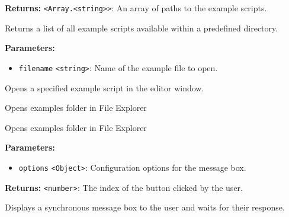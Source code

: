 \documentclass[12pt,a4paper]{article}
\begin{document}
\noindent \textbf{Returns:} \texttt{<Array.<string>>}: An array of paths to the example scripts.

\noindent Returns a list of all example scripts available within a predefined directory.

\vspace{5mm}
\noindent {}


\noindent \textbf{Parameters:}
\begin{itemize}
  \item \texttt{filename} \texttt{<string>}: Name of the example file to open.
\end{itemize}

\noindent Opens a specified example script in the editor window.

\vspace{5mm}
\noindent {}


\noindent Opens examples folder in File Explorer

\vspace{5mm}
\noindent {}


\noindent Opens examples folder in File Explorer

\vspace{5mm}
\noindent {}


\noindent \textbf{Parameters:}
\begin{itemize}
  \item \texttt{options} \texttt{<Object>}: Configuration options for the message box.
\end{itemize}

\noindent \textbf{Returns:} \texttt{<number>}: The index of the button clicked by the user.

\noindent Displays a synchronous message box to the user and waits for their response.

\vspace{5mm}
\noindent {}
\end{document}
